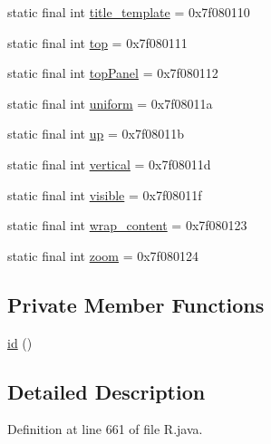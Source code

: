 \begin{DoxyCompactItemize}
\item 
static final int \mbox{\hyperlink{classcom_1_1synnapps_1_1carouselview_1_1_r_1_1id_a59f798cb59c6deea6dff49f4e2119aa2}{title\+\_\+template}} = 0x7f080110
\item 
static final int \mbox{\hyperlink{classcom_1_1synnapps_1_1carouselview_1_1_r_1_1id_a071a2745a1228346e43b75c99fc77113}{top}} = 0x7f080111
\item 
static final int \mbox{\hyperlink{classcom_1_1synnapps_1_1carouselview_1_1_r_1_1id_ae3d358d486eb21e6b3cf3cc1db3f81e3}{top\+Panel}} = 0x7f080112
\item 
static final int \mbox{\hyperlink{classcom_1_1synnapps_1_1carouselview_1_1_r_1_1id_a7dccc5cb2b747f148ea0916ea306c2d1}{uniform}} = 0x7f08011a
\item 
static final int \mbox{\hyperlink{classcom_1_1synnapps_1_1carouselview_1_1_r_1_1id_ac13ba2a5f114359bed948f12555dc844}{up}} = 0x7f08011b
\item 
static final int \mbox{\hyperlink{classcom_1_1synnapps_1_1carouselview_1_1_r_1_1id_a8f35064ae585cbfe59fa891163eddd14}{vertical}} = 0x7f08011d
\item 
static final int \mbox{\hyperlink{classcom_1_1synnapps_1_1carouselview_1_1_r_1_1id_ab5111df2be218c4a85af19878d245b83}{visible}} = 0x7f08011f
\item 
static final int \mbox{\hyperlink{classcom_1_1synnapps_1_1carouselview_1_1_r_1_1id_a0c2412694b6f7d40c79f7f4397fd60c3}{wrap\+\_\+content}} = 0x7f080123
\item 
static final int \mbox{\hyperlink{classcom_1_1synnapps_1_1carouselview_1_1_r_1_1id_af872f48dda88ab7bc9941b95fce004ae}{zoom}} = 0x7f080124
\end{DoxyCompactItemize}
\subsection*{Private Member Functions}
\begin{DoxyCompactItemize}
\item 
\mbox{\hyperlink{classcom_1_1synnapps_1_1carouselview_1_1_r_1_1id_a0fa81dba49c5c05ce8fda5b413521860}{id}} ()
\end{DoxyCompactItemize}


\subsection{Detailed Description}


Definition at line 661 of file R.\+java.



